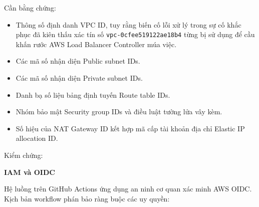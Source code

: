 Cần bằng chứng:

\begin{itemize}
\tightlist
\item
  Thông số định danh VPC ID, tuy rằng biến cố lỗi xử lý trong sự cố khắc
  phục đã kiên thấu xác tín số \texttt{vpc-\allowbreak{}0cfee519122ae18b4} từng bị sử
  dụng để cầu khấn rước AWS Load Balancer Controller múa việc.
\item
  Các mã số nhận diện Public subnet IDs.
\item
  Các mã số nhận diện Private subnet IDs.
\item
  Danh bạ số liệu bảng định tuyến Route table IDs.
\item
  Nhóm bảo mật Security group IDs và điều luật tường lửa vây kèm.
\item
  Số hiệu của NAT Gateway ID kết hợp mã cấp tài khoản địa chỉ Elastic IP
  allocation ID.
\end{itemize}

Kiểm chứng:

\begin{Shaded}
\begin{Highlighting}[]
\end{Highlighting}
\end{Shaded}

\vspace{0.5em}\noindent\textbf{IAM và OIDC}\par

Hệ luồng trên GitHub Actions ứng dụng an ninh cơ quan xác minh AWS OIDC.
Kịch bản workflow phán bảo ràng buộc các uy quyền:

\begin{Shaded}
\begin{Highlighting}[]
\KeywordTok{:}
\AttributeTok{  }\KeywordTok{:}
\AttributeTok{  }\KeywordTok{:}
\end{Highlighting}
\end{Shaded}

